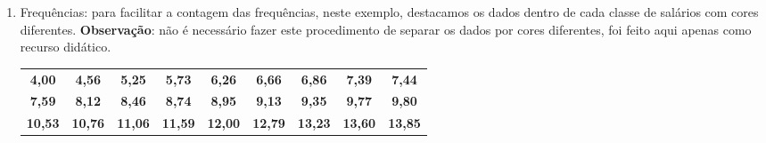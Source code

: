 \documentclass[11pt,fleqn]{book} %
\begin{document}
\begin{example}
\begin{enumerate}
	Na Tabela~\ref{tab:distfreqquant3} são apresentadas as classes de salários obtidas. Para finaizar a tabela basta observar o conjunto de dados ordenados e contar quantos dados tem em cada classe.
	
	\begin{table}[h]
	\caption{Classes de salários}
	\label{tab:distfreqquant3} 
	\vspace{0.1cm}
	\centering
	\begin{tabular}{l c l}
	\toprule
	\textbf{Salários} & $\bm{f_i}$ & \\
	\midrule
	\,\,\,$4,0 \vdash 7,5$  &  ? & \\
	\,\,\,$7,5 \vdash 11,0$  &  ? & \\
	$11,0 \vdash 14,5$  &  ?  & \\
	$14,5 \vdash 18,0$  & ? & \\
	$18,0 \vdash 21,5$  &  ? & \\	
	$21,5 \vdash 25,0$  &  ? & \\	
	\hline
	Total  &  ? & \\
	\bottomrule
	\end{tabular} \\
	\end{table}
	
	\vspace{0.4 cm}
	
	\item Frequências: para facilitar a contagem das frequências, neste exemplo, destacamos os dados dentro de cada classe de salários com cores diferentes. {\bf Observação}: não é necessário fazer este procedimento de separar os dados por cores diferentes, foi feito aqui apenas como recurso didático.\\
	
	
	\begin{center}
	\begin{tabular}{c c c c c c c c c}
	\hline
	\textcolor{ocre}{\bf 4,00}  &  \textcolor{ocre}{\bf 4,56}  &  \textcolor{ocre}{\bf 5,25}  &  
	\textcolor{ocre}{\bf 5,73}  &  \textcolor{ocre}{\bf 6,26}  &  \textcolor{ocre}{\bf 6,66}	&	
	\textcolor{ocre}{\bf 6,86}  &  \textcolor{ocre}{\bf 7,39}  &  \textcolor{ocre}{\bf 7,44} \\
	
	{\bf 7,59}  &  {\bf 8,12}  &  {\bf 8,46}	&	{\bf 8,74}  &  {\bf 8,95}  &  {\bf 9,13}  &  
	{\bf 9,35}  &  {\bf 9,77}  &  {\bf 9,80} \\
	{\bf 10,53}  &  {\bf 10,76}  &  
	
	\textcolor{verdescuro}{\bf 11,06}  &	\textcolor{verdescuro}{\bf 11,59}  &  \textcolor{verdescuro}{\bf 12,00}  &  
	\textcolor{verdescuro}{\bf 12,79}	&	\textcolor{verdescuro}{\bf 13,23}	&  \textcolor{verdescuro}{\bf 13,60}  &  
	\textcolor{verdescuro}{\bf 13,85}  \\
	

\end{tabular}
\end{center}
\end{enumerate}
\end{example}
\end{document}
